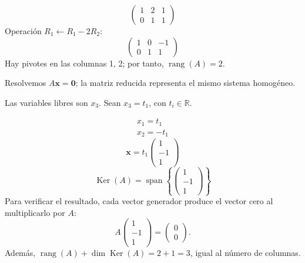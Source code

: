 \documentclass[12pt]{article}
\theoremstyle{remark}
\newcommand{\rang}{\operatorname{rang}}
\newcommand{\Ker}{\operatorname{Ker}}
\newcommand{\vect}[1]{\boldsymbol{#1}}
\begin{document}
\[
\begin{pmatrix}1&2&1\\0&1&1\end{pmatrix}
\]
Operación $R_{1}\leftarrow R_{1}-2R_{2}$:
\[
\begin{pmatrix}1&0&-1\\0&1&1\end{pmatrix}
\]
Hay pivotes en las columnas 1, 2; por tanto, $\boxed{\rang(A)=2}$.

Resolvemos $A\vect x=\vect0$; la matriz reducida representa el mismo sistema homogéneo.

Las variables libres son $x_{3}$. Sean $x_{3}=t_{1}$, con $t_i\in\mathbb R$.

\[
\begin{aligned}x_{1}=t_{1}\\x_{2}=- t_{1}\end{aligned}
\]
\[
\vect x=t_{1}\begin{pmatrix}1\\-1\\1\end{pmatrix}
\]
\[
\boxed{\Ker(A)=\operatorname{span}\left\{\begin{pmatrix}1\\-1\\1\end{pmatrix}\right\}}
\]
Para verificar el resultado, cada vector generador produce el vector cero al multiplicarlo por $A$:
\[
A\begin{pmatrix}1\\-1\\1\end{pmatrix}=\begin{pmatrix}0\\0\end{pmatrix}.
\]
Además, $\rang(A)+\dim\Ker(A)=2+1=3$, igual al número de columnas.
\end{document}
